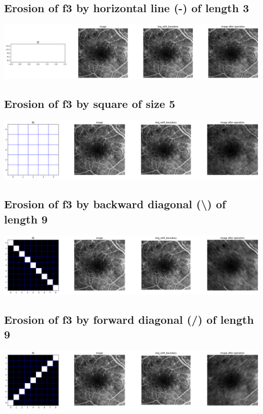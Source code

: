 \documentclass{article}
\begin{document}
\subsection{Erosion of f3 by horizontal line (-) of length 3}
\includegraphics[width=\linewidth]{images/ef3_e2.png}
\\ 
\subsection{Erosion of f3 by square of size 5}
\includegraphics[width=\linewidth]{images/ef3_e3.png}
\\ 
\subsection{Erosion of f3 by backward diagonal (\textbackslash) of length 9}
\includegraphics[width=\linewidth]{images/ef3_e4.png}
\\ 
\subsection{Erosion of f3 by forward diagonal (/) of length 9}
\includegraphics[width=\linewidth]{images/ef3_e5.png}
\\ 
\end{document}
